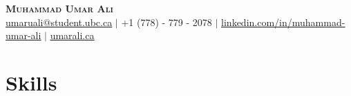 \documentclass[letterpaper,11pt]{article}
\newcommand{\resumeItemListStart}{\begin{itemize}[leftmargin=*]}
\newcommand{\resumeItemListEnd}{\end{itemize}\vspace{-5pt}}
\newcommand\bbold[1]{\textcolor{primay}{\textbf{#1}}}
\newcommand\bunderline[1]{\textcolor{primay}{\underline{#1}}}
\begin{document}

\begin{center}
    \bbold{\LARGE \scshape Muhammad Umar Ali} \\ \vspace{1pt}
    \href{mailto:umaruali@student.ubc.ca}{\bunderline{umaruali@student.ubc.ca}} $|$ \small +1 (778) - 779 - 2078 $|$ 
    \href{https://www.linkedin.com/in/muhammad-umar-ali/}{\bunderline{linkedin.com/in/muhammad-umar-ali}} $|$
    \href{https://umarali.ca/}{\bunderline{umarali.ca}}
\end{center}

\vspace{-0.75cm}

\section{Skills}

\end{document}
